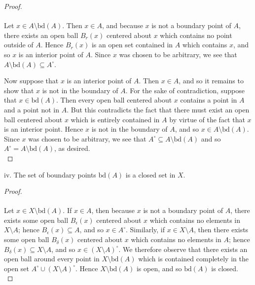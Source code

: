 \begin{proof}\ \\\\
    Let $x \in A \setminus \text{bd}(A)$. Then $x \in A$, and because $x$ is not a boundary point of $A$, there exists 
    an open ball $B_r(x)$ centered about $x$ which contains no point outside of $A$. Hence $B_r(x)$ is an open set 
    contained in $A$ which contains $x$, and so $x$ is an interior point of $A$. Since $x$ was chosen to be arbitrary, 
    we see that $A \setminus \text{bd}(A) \subseteq A^\circ$.

    Now suppose that $x$ is an interior point of $A$. Then $x \in A$, and so it remains to show that $x$ is not in the
    boundary of $A$. For the sake of contradiction, suppose that $x \in \text{bd}(A)$. Then every open ball centered 
    about $x$ contains a point in $A$ and a point not in $A$. But this contradicts the fact that there must exist an 
    open ball centered about $x$ which is entirely contained in $A$ by virtue of the fact that $x$ is an interior point.
    Hence $x$ is not in the boundary of $A$, and so $x \in A \setminus \text{bd}(A)$. Since $x$ was chosen to be 
    arbitrary, we see that $A^\circ \subseteq A \setminus \text{bd}(A)$ and so $A^\circ = A \setminus \text{bd}(A)$, as 
    desired.
    \ \\
\end{proof}

\pagebreak

iv. The set of boundary points $\text{bd}(A)$ is a closed set in $X$.  \ \\
    
\begin{proof}\ \\\\
    Let $x \in X \setminus \text{bd}(A)$. If $x \in A$, then because $x$ is not a boundary point of $A$, there exists 
    some open ball $B_\epsilon(x)$ centered about $x$ which contains no elements in $X \setminus A$; hence 
    $B_\epsilon(x) \subseteq A$, and so $x \in A^\circ$. Similarly, if $x \in X \setminus A$, then there exists some
    open ball $B_\delta(x)$ centered about $x$ which contains no elements in $A$; hence 
    $B_\delta(x) \subseteq X \setminus A$, and so $x \in (X \setminus A)^\circ$. We therefore observe that there exists
    an open ball around every point in $X \setminus \text{bd}(A)$ which is contained completely in the open set 
    $A^\circ \cup (X \setminus A)^\circ$. Hence $X \setminus \text{bd}(A)$ is open, and so $\text{bd}(A)$ is closed.
    \ \\
\end{proof}

